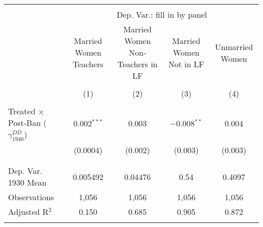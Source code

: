 
\begin{tabular}{@{\extracolsep{5pt}}lcccc} 
\\[-1.8ex]\hline 
\hline \\[-1.8ex] 
 & \multicolumn{4}{c}{Dep. Var.: fill in by panel} \\ 
\cline{2-5} 
 & Married Women Teachers & Married Women Non-Teachers in LF & Married Women Not in LF & Unmarried Women \\ 
\\[-1.8ex] & (1) & (2) & (3) & (4)\\ 
\hline \\[-1.8ex] 
 Treated $\times$ Post-Ban ($\gamma_{1940}^{DD}$) & 0.002$^{***}$ & 0.003 & $-$0.008$^{**}$ & 0.004 \\ 
  & (0.0004) & (0.002) & (0.003) & (0.003) \\ 
  & & & & \\ 
\hline \\[-1.8ex] 
Dep. Var. 1930 Mean & 0.005492 & 0.04476 & 0.54 & 0.4097 \\ 
Observations & 1,056 & 1,056 & 1,056 & 1,056 \\ 
Adjusted R$^{2}$ & 0.150 & 0.685 & 0.905 & 0.872 \\ 
\hline 
\hline \\[-1.8ex] 
\end{tabular} 
